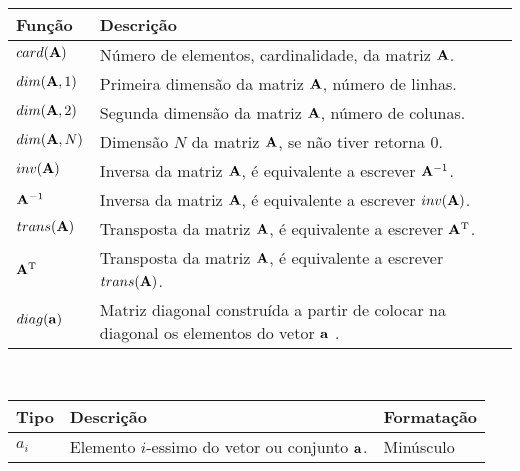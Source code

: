 \begin{notation}~\\
\begin{tabular}{p{} |  p{} }
\hline	
Função & Descrição \\ \hline
$card(\MATRIX{A})$ & Número de elementos, cardinalidade, da matriz $\MATRIX{A}$. \\
\hline
$dim(\MATRIX{A},1)$ & Primeira dimensão da matriz $\MATRIX{A}$, número de linhas. \\
$dim(\MATRIX{A},2)$ & Segunda dimensão da matriz $\MATRIX{A}$, número de colunas. \\
$dim(\MATRIX{A},N)$ & Dimensão $N$ da matriz $\MATRIX{A}$, se não tiver retorna $0$. \\
\hline
$\funcinv(\MATRIX{A})$ & Inversa da matriz $\MATRIX{A}$, é equivalente a escrever $\MATRIX{A}^{-1}$. \\
$\MATRIX{A}^{-1}$ & Inversa da matriz $\MATRIX{A}$, é equivalente a escrever $\funcinv(\MATRIX{A})$. \\
\hline
$\functrans(\MATRIX{A})$ & Transposta da matriz $\MATRIX{A}$, é equivalente a escrever $\MATRIX{A}^{\transpose}$. \\
$\MATRIX{A}^{\transpose}$ & Transposta da matriz $\MATRIX{A}$, é equivalente a escrever $trans(\MATRIX{A})$. \\
\hline
$\funcdiag(\VECTOR{a})$ & Matriz diagonal construída a partir de colocar na diagonal os elementos do vetor $\VECTOR{a}$ . \\
\end{tabular}
\end{notation}

\newpage
\begin{notation}~\\
\begin{tabular}{p{} | p{} | p{}}
\hline	
Tipo & Descrição & Formatação \\ \hline
$a_{i}$ & Elemento $i$-essimo do vetor ou conjunto  $\VECTOR{a}$.& Minúsculo \\
\end{tabular}
\end{notation}


